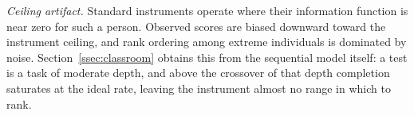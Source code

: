 \documentclass{article}
\begin{document}
\emph{Ceiling artifact.} Standard instruments operate where their information function is near zero for such a person. Observed scores are biased downward toward the instrument ceiling, and rank ordering among extreme individuals is dominated by noise. Section~\ref{ssec:classroom} obtains this from the sequential model itself: a test is a task of moderate depth, and above the crossover of that depth completion saturates at the ideal rate, leaving the instrument almost no range in which to rank.
\end{document}
